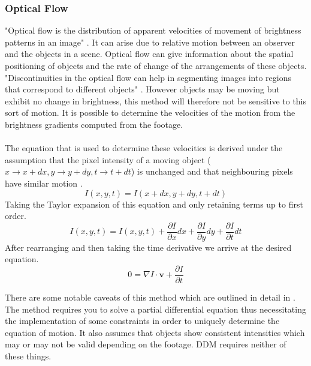\documentclass[11pt]{article}
\begin{document}
\subsubsection{Optical Flow}
"Optical flow is the distribution of apparent velocities of movement of brightness patterns in an image" \cite{optical_flow}. It can arise due to relative motion between an observer and the objects in a scene. Optical flow can give information about the spatial positioning of objects and the rate of change of the arrangements of these objects. "Discontinuities in the optical flow can help in segmenting images into regions that correspond to different objects" \cite{optical_flow}. However objects may be moving but exhibit no change in brightness, this method will therefore not be sensitive to this sort of motion. It is possible to determine the velocities of the motion from the brightness gradients computed from the footage.
\\\\
The equation that is used to determine these velocities is derived under the assumption that the pixel intensity of a moving object ($x \rightarrow x + dx, y \rightarrow y + dy, t \rightarrow t + dt $) is unchanged and that neighbouring pixels have similar motion \cite{optical_flow_opencv}.
\begin{equation}
I(x, y, t) = I(x + dx, y + dy, t + dt)
\end{equation}
Taking the Taylor expansion of this equation and only retaining terms up to first order.
\begin{equation}
I(x, y, t) = I(x, y, t) + \frac{\partial I}{\partial x} dx + \frac{\partial I}{\partial y} dy + \frac{\partial I}{\partial t} dt
\end{equation}
After rearranging and then taking the time derivative we arrive at the desired equation.
\begin{equation}
0 = \nabla I \cdot \textbf{v} + \frac{\partial I}{\partial t}
\end{equation}
 
There are some notable caveats of this method which are outlined in detail in \cite{optical_flow}. The method requires you to solve a partial differential equation thus necessitating the implementation of some constraints in order to uniquely determine the equation of motion. It also assumes that objects show consistent intensities which may or may not be valid depending on the footage. DDM requires neither of these things.
\end{document}
